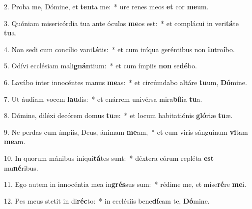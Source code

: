 2. Proba me, Dómine, et \textbf{ten}ta me:~*  ure renes meos \textbf{et} cor \textbf{me}um.\

3. Quóniam misericórdia tua ante óculos \textbf{me}os est:~*  et complácui in veri\textbf{tá}te \textbf{tu}a.\

4. Non sedi cum concílio vani\textbf{tá}tis:~*  et cum iníqua geréntibus non \textbf{in}tro\textbf{í}bo.\

5. Odívi ecclésiam mali\textbf{gnán}tium:~*  et cum ímpiis \textbf{non} se\textbf{dé}bo.\

6. Lavábo inter innocéntes manus \textbf{me}as:~*  et circúmdabo altáre \textbf{tu}um, \textbf{Dó}mine.\

7. Ut áudiam vocem \textbf{lau}dis:~*  et enárrem univérsa mira\textbf{bí}lia \textbf{tu}a.\

8. Dómine, diléxi decórem domus \textbf{tu}æ:~*  et locum habitatiónis \textbf{gló}riæ \textbf{tu}æ.\

9. Ne perdas cum ímpiis, Deus, ánimam \textbf{me}am,~*  et cum viris sánguinum \textbf{vi}tam \textbf{me}am.\

10. In quorum mánibus iniqui\textbf{tá}tes sunt:~*  déxtera eórum repléta \textbf{est} mu\textbf{né}ribus.\

11. Ego autem in innocéntia mea in\textbf{grés}sus sum:~*  rédime me, et mise\textbf{ré}re \textbf{me}i.\

12. Pes meus stetit in di\textbf{réc}to:~*  in ecclésiis bene\textbf{dí}cam te, \textbf{Dó}mine.\

